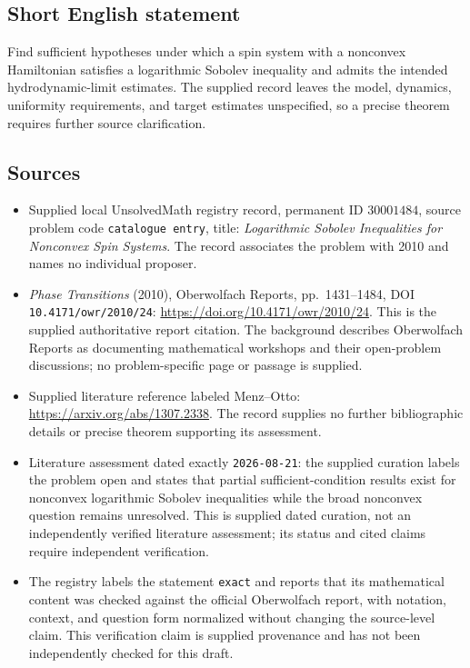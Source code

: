 \documentclass[11pt]{article}
\begin{document}
\subsection{Short English statement}
Find sufficient hypotheses under which a spin system with a nonconvex Hamiltonian satisfies a logarithmic Sobolev inequality and admits the intended hydrodynamic-limit estimates. The supplied record leaves the model, dynamics, uniformity requirements, and target estimates unspecified, so a precise theorem requires further source clarification.
\subsection{Sources}
\begin{itemize}
\item Supplied local UnsolvedMath registry record, permanent ID \(30001484\), source problem code \texttt{catalogue entry}, title: \emph{Logarithmic Sobolev Inequalities for Nonconvex Spin Systems}. The record associates the problem with 2010 and names no individual proposer.
\item \emph{Phase Transitions} (2010), Oberwolfach Reports, pp.\ 1431--1484, DOI \texttt{10.4171/owr/2010/24}: \url{https://doi.org/10.4171/owr/2010/24}. This is the supplied authoritative report citation. The background describes Oberwolfach Reports as documenting mathematical workshops and their open-problem discussions; no problem-specific page or passage is supplied.
\item Supplied literature reference labeled Menz--Otto: \url{https://arxiv.org/abs/1307.2338}. The record supplies no further bibliographic details or precise theorem supporting its assessment.
\item Literature assessment dated exactly \texttt{2026-08-21}: the supplied curation labels the problem open and states that partial sufficient-condition results exist for nonconvex logarithmic Sobolev inequalities while the broad nonconvex question remains unresolved. This is supplied dated curation, not an independently verified literature assessment; its status and cited claims require independent verification.
\item The registry labels the statement \texttt{exact} and reports that its mathematical content was checked against the official Oberwolfach report, with notation, context, and question form normalized without changing the source-level claim. This verification claim is supplied provenance and has not been independently checked for this draft.
\end{itemize}
\end{document}
